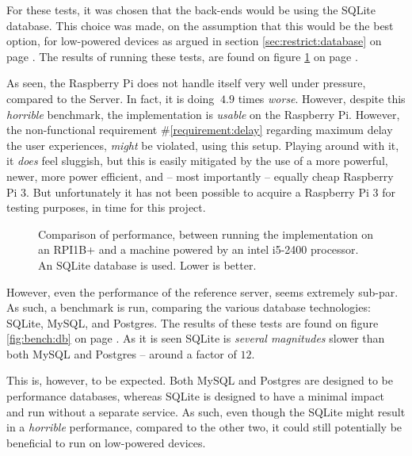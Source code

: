 	For these tests, it was chosen that the back-ends would be using the SQLite database. This choice was made, on the assumption that this would be the best option, for low-powered devices as argued in section \ref{sec:restrict:database} on page \pageref{sec:restrict:database}. The results of running these tests, are found on figure \ref{fig:bench:arch} on page \pageref{fig:bench:arch}. 

	As seen, the Raspberry Pi does not handle itself very well under pressure, compared to the Server. In fact, it is doing $~4.9$ times \emph{worse}. However, despite this \emph{horrible} benchmark, the implementation is \emph{usable} on the Raspberry Pi. However, the non-functional requirement \#\ref{requirement:delay} regarding maximum delay the user experiences, \emph{might} be violated, using this setup. Playing around with it, it \emph{does} feel sluggish, but this is easily mitigated by the use of a more powerful, newer, more power efficient, and -- most importantly -- equally cheap Raspberry Pi 3. But unfortunately it has not been possible to acquire a Raspberry Pi 3 for testing purposes, in time for this project.

	\begin{figure}[!h]
		\centering
	    \caption{Comparison of performance, between running the implementation on an RPI1B+ and a machine powered by an intel i5-2400 processor. An SQLite database is used. Lower is better.}
	    \label{fig:bench:arch}
	\end{figure}

	However, even the performance of the reference server, seems extremely sub-par. As such, a benchmark is run, comparing the various database technologies: SQLite, MySQL, and Postgres. The results of these tests are found on figure \ref{fig:bench:db} on page \pageref{fig:bench:db}. As it is seen SQLite is \emph{several magnitudes} slower than both MySQL and Postgres -- around a factor of $12$.

	This is, however, to be expected. Both MySQL and Postgres are designed to be performance databases, whereas SQLite is designed to have a minimal impact and run without a separate service. As such, even though the SQLite might result in a \emph{horrible} performance, compared to the other two, it could still potentially be beneficial to run on low-powered devices.

